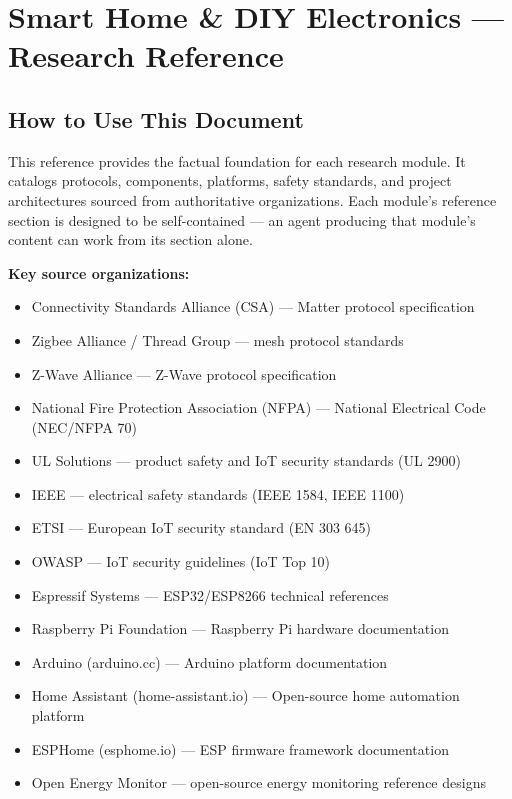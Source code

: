 \documentclass[11pt,letterpaper]{article}
\begin{document}
\section{Smart Home \& DIY Electronics --- Research Reference}

\subsection{How to Use This Document}

This reference provides the factual foundation for each research module. It catalogs protocols, components, platforms, safety standards, and project architectures sourced from authoritative organizations. Each module's reference section is designed to be self-contained --- an agent producing that module's content can work from its section alone.

\textbf{Key source organizations:}
\begin{itemize}[leftmargin=2em]
  \item Connectivity Standards Alliance (CSA) --- Matter protocol specification
  \item Zigbee Alliance / Thread Group --- mesh protocol standards
  \item Z-Wave Alliance --- Z-Wave protocol specification
  \item National Fire Protection Association (NFPA) --- National Electrical Code (NEC/NFPA 70)
  \item UL Solutions --- product safety and IoT security standards (UL 2900)
  \item IEEE --- electrical safety standards (IEEE 1584, IEEE 1100)
  \item ETSI --- European IoT security standard (EN 303 645)
  \item OWASP --- IoT security guidelines (IoT Top 10)
  \item Espressif Systems --- ESP32/ESP8266 technical references
  \item Raspberry Pi Foundation --- Raspberry Pi hardware documentation
  \item Arduino (arduino.cc) --- Arduino platform documentation
  \item Home Assistant (home-assistant.io) --- Open-source home automation platform
  \item ESPHome (esphome.io) --- ESP firmware framework documentation
  \item Open Energy Monitor --- open-source energy monitoring reference designs
\end{itemize}
\end{document}

